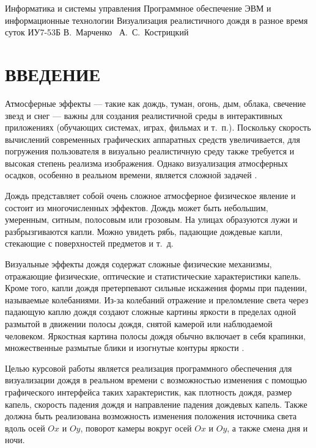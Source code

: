 



\makecourseworktitle
    {Информатика и системы управления}
    {Программное обеспечение ЭВМ и информационные технологии}
    {Визуализация реалистичного дождя в разное время суток}
    {ИУ7-53Б}
    {В.~Марченко}
    {~А.~С.~Кострицкий}
    {}
    {}
    
\setcounter{page}{3}
    
\maketableofcontents

{\centering \chapter*{ВВЕДЕНИЕ}}

Атмосферные эффекты --- такие как дождь, туман, огонь, дым, облака, свечение звезд и снег --- важны для создания реалистичной среды в интерактивных приложениях (обучающих системах, играх, фильмах и т.~п.). 
Поскольку скорость вычислений современных графических аппаратных средств увеличивается, для погружения пользователя в визуально реалистичную среду также требуется и высокая степень реализма изображения. 
Однако визуализация атмосферных осадков, особенно в реальном времени, является сложной задачей \cite[1]{Tariq2007}.

Дождь представляет собой очень сложное атмосферное физическое явление и состоит из многочисленных эффектов. 
Дождь может быть небольшим, умеренным, ситным, полосовым или грозовым. 
На улицах образуются лужи и разбрызгиваются капли. 
Можно увидеть рябь, падающие дождевые капли, стекающие с поверхностей предметов и т.~д. \cite{Hao2008}

Визуальные эффекты дождя содержат сложные физические механизмы, отражающие физические, оптические и статистические характеристики капель. 
Кроме того, капли дождя претерпевают сильные искажения формы при падении, называемые колебаниями. 
Из-за колебаний отражение и преломление света через падающую каплю дождя создают сложные картины яркости в пределах одной размытой в движении полосы дождя, снятой камерой или наблюдаемой человеком. 
Яркостная картина полосы дождя обычно включает в себя крапинки, множественные размытые блики и изогнутые контуры яркости \cite{Garg2006}.

Целью курсовой работы является реализация программного обеспечения для визуализации дождя в реальном времени с возможностью изменения с помощью графического интерфейса таких характеристик, как плотность дождя, размер капель, скорость падения дождя и направление падения дождевых капель. 
Также должна быть реализована возможность изменения положения источника света вдоль осей $Ox$ и $Oy$, поворот камеры вокруг осей $Ox$ и $Oy$, а также смена дня и ночи.

